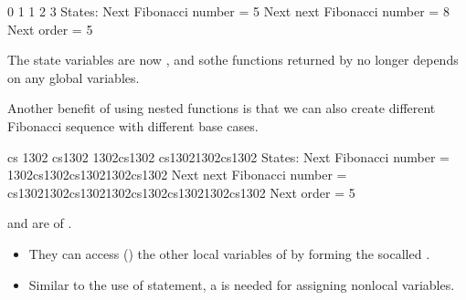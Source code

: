 \documentclass[letterpaper,10pt,english]{sphinxmanual}
\begin{document}
\begin{sphinxVerbatim}[commandchars=\\\{\}]
0
1
1
2
3
States:
        Next Fibonacci number      = 5
        Next next Fibonacci number = 8
        Next order                 = 5
\end{sphinxVerbatim}

The state variables  are now , and sothe functions returned by  no longer depends on any global variables.

Another benefit of using nested functions is that we can also create different Fibonacci sequence with different base cases.

\begin{sphinxVerbatim}[commandchars=\\\{\}]
    
   
\end{sphinxVerbatim}

\begin{sphinxVerbatim}[commandchars=\\\{\}]
cs
1302
cs1302
1302cs1302
cs13021302cs1302
States:
        Next Fibonacci number      = 1302cs1302cs13021302cs1302
        Next next Fibonacci number = cs13021302cs13021302cs1302cs13021302cs1302
        Next order                 = 5
\end{sphinxVerbatim}

 and  are  of .
\begin{itemize}
\item {} 
They can access () the other local variables of  by forming the so\sphinxhyphen{}called .

\item {} 
Similar to the use of  statement, a  is needed for assigning nonlocal variables.

\end{itemize}
\end{document}
